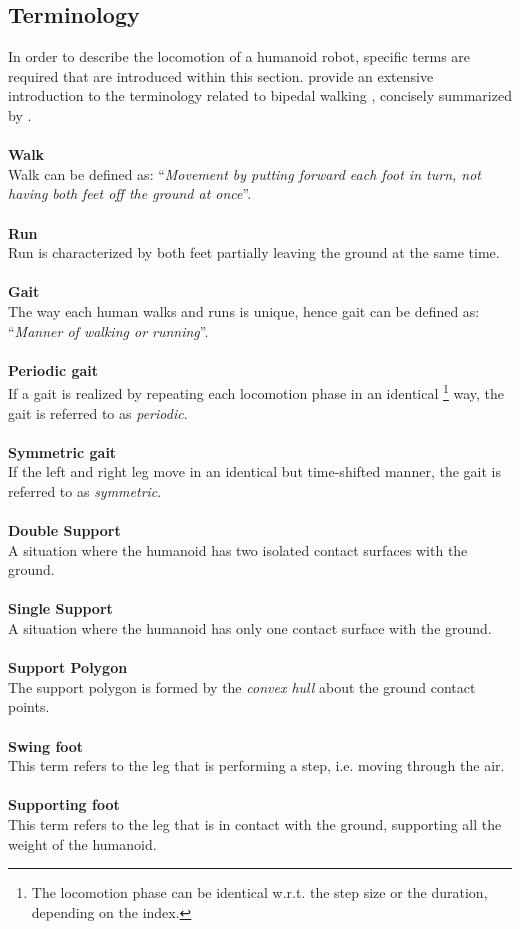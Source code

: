 \subsection{Terminology}
In order to describe the locomotion of a humanoid robot, specific terms are required that are introduced within this section. \citeauthor{vukobratovic2007towards} provide an extensive introduction to the terminology related to bipedal walking \cite{vukobratovic2007towards}, concisely summarized by \citeauthor{dekker2009zero} \cite{dekker2009zero}.\\\\
\textbf{Walk}\\
Walk can be defined as: ``\textit{Movement by putting forward each foot in turn, not having both feet off the ground at once}''.\\\\
\textbf{Run}\\
Run is characterized by both feet partially leaving the ground at the same time.\\\\
\textbf{Gait}\\
The way each human walks and runs is unique, hence gait can be defined as: ``\textit{Manner of walking or running}''.\\\\
\textbf{Periodic gait}\\
If a gait is realized by repeating each locomotion phase in an identical 
\footnote{The locomotion phase can be identical w.r.t. the step size or the duration, depending on the index.} way, the gait is referred to as \textit{periodic}.\\\\
\textbf{Symmetric gait}\\
If the left and right leg move in an identical but time-shifted manner, the gait is referred to as \textit{symmetric}.\\\\
\textbf{Double Support}\\
A situation where the humanoid has two isolated contact surfaces with the ground.\\\\
\textbf{Single Support}\\
A situation where  the humanoid has only one contact surface with the ground.\\\\
\textbf{Support Polygon}\\%
The support polygon is formed by the \textit{convex hull} about the ground contact points.    \\\\
\textbf{Swing foot}\\
This term refers to the leg that is performing a step, i.e. moving through the air.\\\\
\textbf{Supporting foot}\\
This term refers to the leg that is in contact with the ground, supporting all the weight of the humanoid. 

